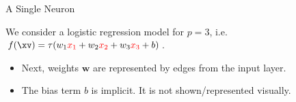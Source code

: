 \begin{frame} {A Single Neuron}

We consider a logistic regression model for $p = 3$, i.e. $f(\xv) = \tau(w_1\textcolor{red}{x_1} + w_2\textcolor{red}{x_2} + w_3\textcolor{red}{x_3} + b)$.

  \begin{itemize}
    \item Next, weights $\mathbf{w}$ are represented by edges from the input layer.
    \begin{figure}
    \centering
  \end{figure}
    \item The bias term $b$ is implicit. It is not shown/represented visually.
  \end{itemize}
\end{frame}

